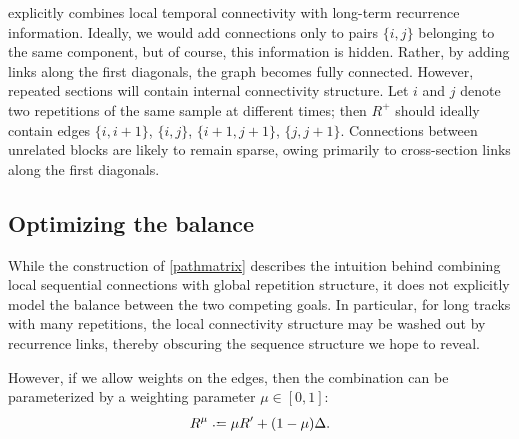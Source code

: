 \documentclass{article}
\begin{document}
 explicitly combines local temporal connectivity with long-term
recurrence information.  Ideally, we would add connections only to pairs $\{i,j\}$
belonging to the same component, but of course, this information is hidden.  Rather,
by adding links along the first diagonals, the graph becomes fully connected.  
However, repeated sections will contain internal connectivity structure.  Let $i$ and
$j$ denote two repetitions of the same sample at different times; then $R^+$ should
ideally contain edges $\{i, i+1\}$, $\{i, j\}$, $\{i+1, j+1\}$, $\{j, j+1\}$.
Connections between unrelated blocks are likely to remain sparse, owing primarily to
cross-section links along the first diagonals.  



\subsection{Optimizing the balance}
While the construction of \cref{pathmatrix} describes the intuition behind combining
local sequential connections with global repetition structure, it does not explicitly
model the balance between the two competing goals.  In particular, for long tracks
with many repetitions, the local connectivity structure may be washed out by
recurrence links, thereby obscuring the sequence structure we hope to reveal.

However, if we allow weights on the edges, then the combination can be parameterized 
by a weighting parameter $\mu \in [0, 1]$:
\begin{equation}
R^\mu \defeq \mu R' + (1 - \mu) \Delta. \label{weightedsum}
\end{equation}
\end{document}
